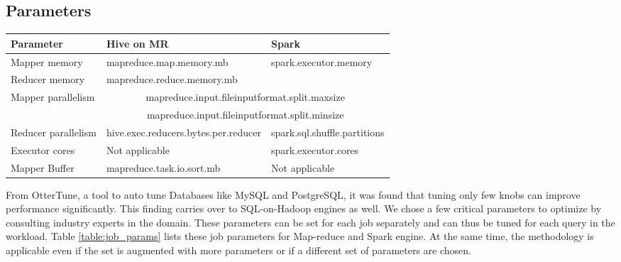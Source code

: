 \subsection{Parameters}


\begin{table*}
	\begin{tabular}{ |l|l|l| } 
		\hline
		Parameter & Hive on MR & Spark \\ 
		\hline
		Mapper memory & mapreduce.map.memory.mb & \multirow{2}{*}{spark.executor.memory} \\
		Reducer memory & mapreduce.reduce.memory.mb & \\
		\hline
		\multirow{2}{*}{Mapper parallelism} & \multicolumn{2}{|c|}{mapreduce.input.fileinputformat.split.maxsize} \\
		& \multicolumn{2}{|c|}{mapreduce.input.fileinputformat.split.minsize} \\
		\hline
		Reducer parallelism & hive.exec.reducers.bytes.per.reducer & spark.sql.shuffle.partitions \\
		\hline
		Executor cores & Not applicable & spark.executor.cores \\
		\hline
		Mapper Buffer & mapreduce.task.io.sort.mb & Not applicable \\
		\hline
	\end{tabular}
	\caption{Parameters of the Job to be optimized}
	\label{table:job_params}
\end{table*}


From OtterTune\cite{vanaken}, a tool to auto tune Databases like MySQL and PostgreSQL, it was found that tuning only few knobs can improve performance significantly. This finding carries over to SQL-on-Hadoop engines as well. We chose a few critical parameters to optimize by consulting industry experts in the domain. These parameters can be set for each job separately and can thus be tuned for each query in the workload. Table \ref{table:job_params} lists these job parameters for Map-reduce and Spark engine. At the same time, the methodology is applicable even if the set is augmented with more parameters or if a different set of parameters are chosen. 



